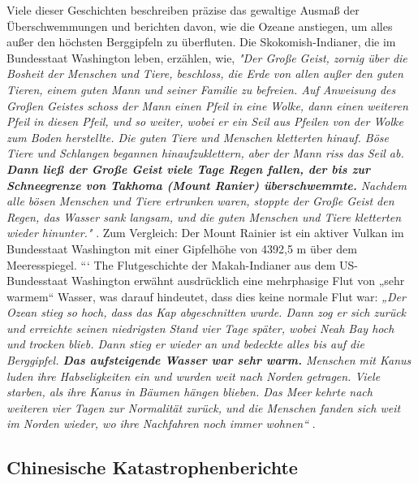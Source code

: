 \documentclass[10pt,twocolumn,letterpaper]{article}
\begin{document}
Viele dieser Geschichten beschreiben präzise das gewaltige Ausmaß der Überschwemmungen und berichten davon, wie die Ozeane anstiegen, um alles außer den höchsten Berggipfeln zu überfluten. Die Skokomish-Indianer, die im Bundesstaat Washington leben, erzählen, wie, \textit{"Der Große Geist, zornig über die Bosheit der Menschen und Tiere, beschloss, die Erde von allen außer den guten Tieren, einem guten Mann und seiner Familie zu befreien. Auf Anweisung des Großen Geistes schoss der Mann einen Pfeil in eine Wolke, dann einen weiteren Pfeil in diesen Pfeil, und so weiter, wobei er ein Seil aus Pfeilen von der Wolke zum Boden herstellte. Die guten Tiere und Menschen kletterten hinauf. Böse Tiere und Schlangen begannen hinaufzuklettern, aber der Mann riss das Seil ab. \textbf{Dann ließ der Große Geist viele Tage Regen fallen, der bis zur Schneegrenze von Takhoma (Mount Ranier) überschwemmte.} Nachdem alle bösen Menschen und Tiere ertrunken waren, stoppte der Große Geist den Regen, das Wasser sank langsam, und die guten Menschen und Tiere kletterten wieder hinunter."} \cite{3}. Zum Vergleich: Der Mount Rainier ist ein aktiver Vulkan im Bundesstaat Washington mit einer Gipfelhöhe von 4392,5 m über dem Meeresspiegel.
```
The Flutgeschichte der Makah-Indianer aus dem US-Bundesstaat Washington erwähnt ausdrücklich eine mehrphasige Flut von „sehr warmem“ Wasser, was darauf hindeutet, dass dies keine normale Flut war: \textit{„Der Ozean stieg so hoch, dass das Kap abgeschnitten wurde. Dann zog er sich zurück und erreichte seinen niedrigsten Stand vier Tage später, wobei Neah Bay hoch und trocken blieb. Dann stieg er wieder an und bedeckte alles bis auf die Berggipfel. \textbf{Das aufsteigende Wasser war sehr warm.} Menschen mit Kanus luden ihre Habseligkeiten ein und wurden weit nach Norden getragen. Viele starben, als ihre Kanus in Bäumen hängen blieben. Das Meer kehrte nach weiteren vier Tagen zur Normalität zurück, und die Menschen fanden sich weit im Norden wieder, wo ihre Nachfahren noch immer wohnen“} \cite{3}.

\subsection{Chinesische Katastrophenberichte}
\end{document}
